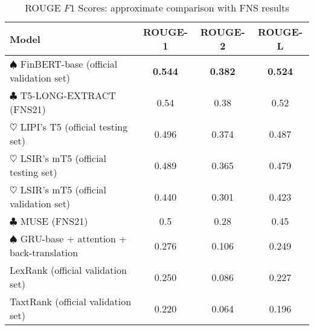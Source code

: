 \begin{table}[ht]
    \centering
    \begin{tabular}{lccc}
        \toprule
        \textbf{Model} & \textbf{ROUGE-1} & \textbf{ROUGE-2} & \textbf{ROUGE-L} \\
        \midrule
            $\spadesuit$ FinBERT-base (official validation set) & \textbf{0.544} & \textbf{0.382} & \textbf{0.524} \\
            $\clubsuit$ T5-LONG-EXTRACT (FNS21) & 0.54 & 0.38 & 0.52 \\
            $\heartsuit$ LIPI's T5 (official testing set) & 0.496 & 0.374 & 0.487 \\
            $\heartsuit$ LSIR's mT5 (official testing set) & 0.489 & 0.365 & 0.479 \\
            $\heartsuit$ LSIR's mT5 (official validation set) & 0.440 & 0.301 & 0.423 \\
            $\clubsuit$ MUSE (FNS21) & 0.5 & 0.28 & 0.45 \\
            $\spadesuit$ GRU-base + attention + back-translation & 0.276 & 0.106 & 0.249 \\
            LexRank (official validation set) & 0.250 & 0.086 & 0.227 \\
            TaxtRank (official validation set) & 0.220 & 0.064 & 0.196 \\
        \bottomrule
    \end{tabular}\caption{ROUGE $F1$ Scores: approximate comparison with FNS results}
    \label{tab:rouge_performance}
\end{table}

